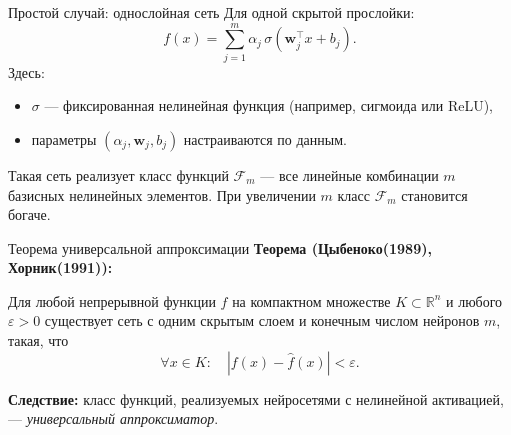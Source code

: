 \documentclass[notheorems, handout]{beamer}
\begin{document}
\begin{frame}{Простой случай: однослойная сеть}
  Для одной скрытой прослойки:
  \[
    f(x) = \sum_{j=1}^m \alpha_j\, \sigma(\bm{w}_j^\top x + b_j).
  \]
  Здесь:
  \begin{itemize}
    \item $\sigma$ — фиксированная нелинейная функция (например, сигмоида или ReLU),
    \item параметры $(\alpha_j,\bm{w}_j,b_j)$ настраиваются по данным.
  \end{itemize}
  Такая сеть реализует класс функций $\mathcal{F}_m$ --- все линейные комбинации $m$ базисных нелинейных элементов.  
  При увеличении $m$ класс $\mathcal{F}_m$ становится богаче.
\end{frame}

\begin{frame}{Теорема универсальной аппроксимации}
  \textbf{Теорема (Цыбеноко(1989), Хорник(1991)):}
  \begin{block}{}
    Для любой непрерывной функции $f$ на компактном множестве $K\subset\mathbb{R}^n$  
    и любого $\varepsilon > 0$ существует сеть с одним скрытым слоем и конечным числом нейронов $m$,  
    такая, что
    \[
      \forall x\in K:\quad |f(x) - \hat f(x)| < \varepsilon.
    \]
  \end{block}

  \vspace{0.5em}
  \textbf{Следствие:} класс функций, реализуемых нейросетями с нелинейной активацией, --- \emph{универсальный аппроксиматор}.
\end{frame}
\end{document}
